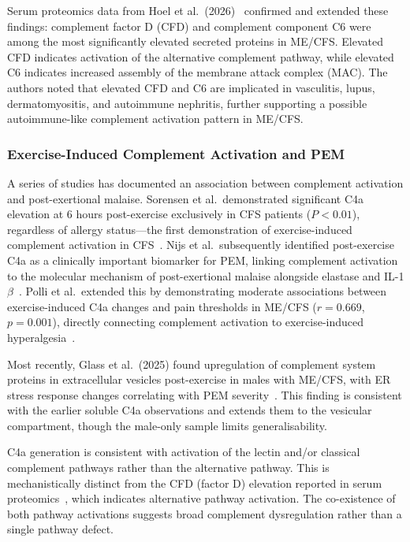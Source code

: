 Serum proteomics data from Hoel et al.\ (2026)~\cite{Hoel2026proteome} confirmed and extended these findings: complement factor D (CFD) and complement component C6 were among the most significantly elevated secreted proteins in ME/CFS. Elevated CFD indicates activation of the alternative complement pathway, while elevated C6 indicates increased assembly of the membrane attack complex (MAC). The authors noted that elevated CFD and C6 are implicated in vasculitis, lupus, dermatomyositis, and autoimmune nephritis, further supporting a possible autoimmune-like complement activation pattern in ME/CFS.

\subsubsection{Exercise-Induced Complement Activation and PEM}
\label{sec:complement-pem}

A series of studies has documented an association between complement activation and post-exertional malaise. Sorensen et al.\ demonstrated significant C4a elevation at 6 hours post-exercise exclusively in CFS patients ($P<0.01$), regardless of allergy status---the first demonstration of exercise-induced complement activation in CFS~\cite{Sorensen2003complement}. Nijs et al.\ subsequently identified post-exercise C4a as a clinically important biomarker for PEM, linking complement activation to the molecular mechanism of post-exertional malaise alongside elastase and IL-1$\beta$~\cite{Nijs2010pem}. Polli et al.\ extended this by demonstrating moderate associations between exercise-induced C4a changes and pain thresholds in ME/CFS ($r=0.669$, $p=0.001$), directly connecting complement activation to exercise-induced hyperalgesia~\cite{Polli2019complement}.

Most recently, Glass et al.\ (2025) found upregulation of complement system proteins in extracellular vesicles post-exercise in males with ME/CFS, with ER stress response changes correlating with PEM severity~\cite{Glass2025ev}. This finding is consistent with the earlier soluble C4a observations and extends them to the vesicular compartment, though the male-only sample limits generalisability.

C4a generation is consistent with activation of the lectin and/or classical complement pathways rather than the alternative pathway. This is mechanistically distinct from the CFD (factor D) elevation reported in serum proteomics~\cite{Hoel2026proteome}, which indicates alternative pathway activation. The co-existence of both pathway activations suggests broad complement dysregulation rather than a single pathway defect.

